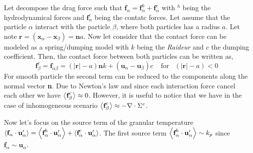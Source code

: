 Let decompose the drag force such that $\textbf{f}_\alpha = \textbf{f}_\alpha^h + \textbf{f}_\alpha^c$ with $^h$ being the hydrodynamical forces and $\textbf{f}^c_\alpha$ being the contatc forces. 
Let assume that the particle $\alpha$ interact with the particle $\beta$, where both particles has a radius $a$.
Let note $\textbf{r} = (\textbf{x}_\alpha - \textbf{x}_\beta) = \textbf{n} a$. 
Now let consider that the contact force can be modeled as a spring/dumping model with $k$ being the \textit{Raideur} and $c$ the dumping coefficient.
Then, the contact force between both particles can be written as, 
\begin{equation}
    \textbf{f}_\beta^c
    = \textbf{f}_{\alpha\beta}
    = (|\textbf{r}| - a) \textbf{n} k 
    + (\textbf{u}_\alpha - \textbf{u}_\beta) c
    \;\;\;\;\text{for} \;\;\; (|\textbf{r}| - a) < 0
\end{equation}
For smooth particle the second term can be reduced to the components along the normal vector \textbf{n}.  
Due to Newton's  law and since each interaction force cancel each other we have $\left<\textbf{f}_\beta^c\right> \approx 0$. 
However, it is useful to notice that we have in the case of inhomogeneous scenario $\left<\textbf{f}_\beta^c\right> \approx - \mathbf{\nabla}\cdot \Sigma^c$.

Now let's focus on the source term of the granular temperature $\left<\textbf{f}_\alpha\cdot \textbf{u}_\alpha'\right> = \left<\textbf{f}_\alpha^h \cdot \textbf{u}_\alpha'\right> + \left<\textbf{f}_\alpha^c\cdot \textbf{u}_\alpha'\right>$. 
The first source term $\left<\textbf{f}_\alpha^h \cdot \textbf{u}_\alpha'\right> \sim k_p$ since $\textbf{f}_\alpha \sim \textbf{u}_\alpha$.

